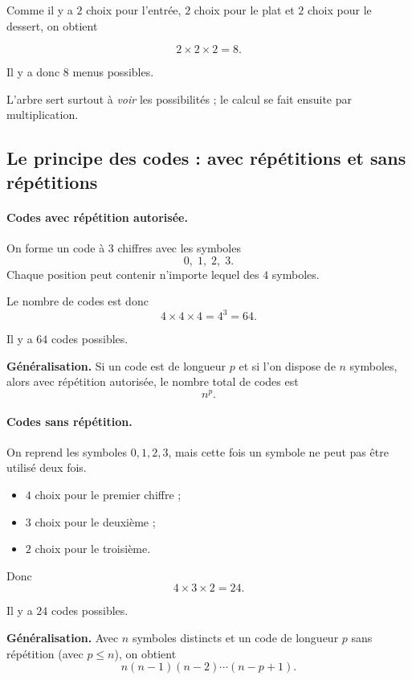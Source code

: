 Comme il y a \(2\) choix pour l’entrée, \(2\) choix pour le plat et \(2\) choix pour le dessert,
on obtient

\[
2\times 2\times 2=8.
\]

Il y a donc \(\boxed{8}\) menus possibles.

\medskip

\noindent
L’arbre sert surtout à \emph{voir} les possibilités ; le calcul se fait ensuite par multiplication.

\subsection{Le principe des codes : avec répétitions et sans répétitions}

\paragraph{Codes avec répétition autorisée.}
On forme un code à \(3\) chiffres avec les symboles
\[
0,\;1,\;2,\;3.
\]
Chaque position peut contenir n’importe lequel des \(4\) symboles.

Le nombre de codes est donc
\[
4\times 4\times 4=4^3=64.
\]

Il y a \(\boxed{64}\) codes possibles.

\medskip

\noindent\textbf{Généralisation.}
Si un code est de longueur \(p\) et si l’on dispose de \(n\) symboles, alors avec répétition autorisée,
le nombre total de codes est
\[
\boxed{n^p}.
\]

\paragraph{Codes sans répétition.}
On reprend les symboles \(0,1,2,3\), mais cette fois un symbole ne peut pas être utilisé deux fois.

\begin{itemize}
    \item \(4\) choix pour le premier chiffre ;
    \item \(3\) choix pour le deuxième ;
    \item \(2\) choix pour le troisième.
\end{itemize}

Donc
\[
4\times 3\times 2=24.
\]

Il y a \(\boxed{24}\) codes possibles.

\medskip

\noindent\textbf{Généralisation.}
Avec \(n\) symboles distincts et un code de longueur \(p\) sans répétition (avec \(p\le n\)), on obtient
\[
\boxed{n(n-1)(n-2)\cdots(n-p+1)}.
\]

